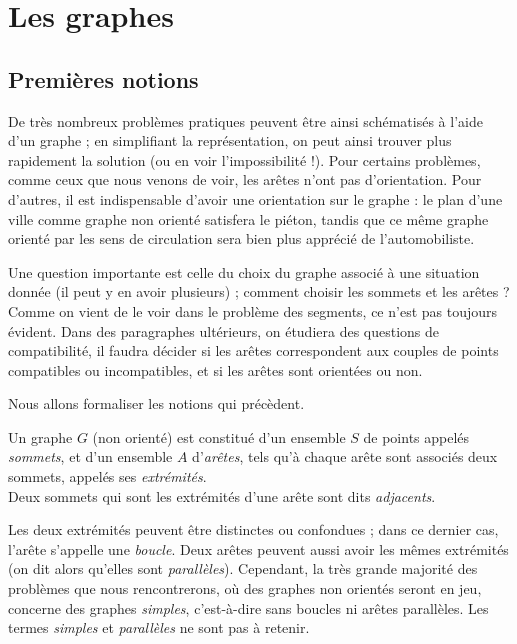 \documentclass[french]{book}
\begin{document}
\tableofcontents

\chapter{Les graphes}
\section{Premi\`eres notions}

De très nombreux problèmes pratiques peuvent être ainsi schématisés à l'aide d'un graphe ; en simplifiant la représentation, on peut ainsi trouver plus rapidement la solution (ou en voir
l'impossibilité !). Pour certains problèmes, comme ceux que nous venons de voir, les arêtes n'ont pas d'orientation. Pour d'autres, il est indispensable d'avoir une orientation sur le graphe : le plan d'une ville comme graphe non orienté satisfera le piéton, tandis que ce même graphe orienté par les sens de circulation sera bien plus apprécié de l'automobiliste.

Une question importante est celle du choix du graphe associé à une situation donnée (il peut
y en avoir plusieurs) ; comment choisir les sommets et les arêtes ? Comme on vient de le voir
dans le problème des segments, ce n'est pas toujours évident. Dans des paragraphes ultérieurs, on étudiera des questions de compatibilité, il faudra décider si les arêtes correspondent aux couples de points compatibles ou incompatibles, et si les arêtes sont orientées ou non.

Nous allons formaliser les notions qui précèdent.



\begin{defn} Un graphe $G$ (non orienté) est constitué d'un ensemble $S$ de points appelés \emph{sommets}, et d'un ensemble $A$ d'\emph{arêtes}, tels qu'à chaque arête sont associés deux sommets, appelés ses \emph{extrémités}.\\
Deux sommets qui sont les extrémités d'une arête sont dits \emph{adjacents}. \end{defn}


Les deux extrémités peuvent être distinctes ou confondues ; dans ce dernier cas, l'arête s'appelle une \emph{boucle}. Deux arêtes peuvent aussi avoir les mêmes extrémités (on dit alors qu'elles sont \emph{parallèles}). Cependant, la très grande majorité des problèmes que nous rencontrerons, où des graphes non orientés seront en jeu, concerne des graphes \emph{simples}, c'est-à-dire sans boucles ni arêtes parallèles. Les termes \emph{simples} et \emph{parallèles} ne sont pas à retenir.
\end{document}
